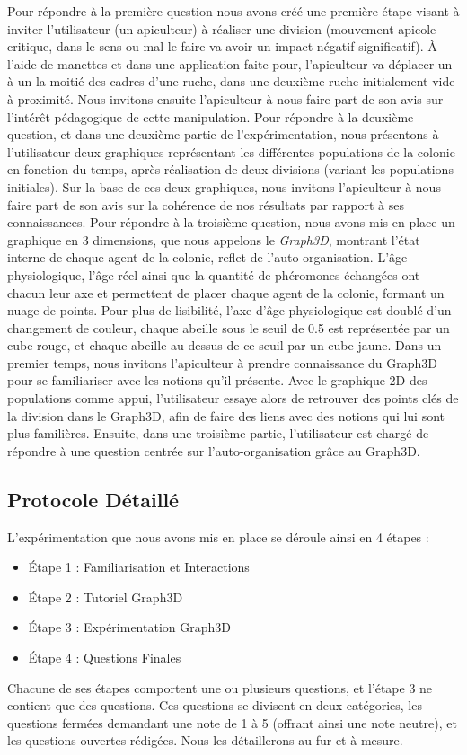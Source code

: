     Pour répondre à la première question nous avons créé une première étape visant à inviter l'utilisateur (un apiculteur) à réaliser une division (mouvement apicole critique, dans le sens ou mal le faire va avoir un impact négatif significatif). À l'aide de manettes et dans une application faite pour, l'apiculteur va déplacer un à un la moitié des cadres d'une ruche, dans une deuxième ruche initialement vide à proximité. Nous invitons ensuite l'apiculteur à nous faire part de son avis sur l'intérêt pédagogique de cette manipulation.
    Pour répondre à la deuxième question, et dans une deuxième partie de l'expérimentation, nous présentons à l'utilisateur deux graphiques représentant les différentes populations de la colonie en fonction du temps, après réalisation de deux divisions (variant les populations initiales). Sur la base de ces deux graphiques, nous invitons l'apiculteur à nous faire part de son avis sur la cohérence de nos résultats par rapport à ses connaissances.
    Pour répondre à la troisième question, nous avons mis en place un graphique en 3 dimensions, que nous appelons le \textit{Graph3D}, montrant l'état interne de chaque agent de la colonie, reflet de l'auto-organisation. L'âge physiologique, l'âge réel ainsi que la quantité de phéromones échangées ont chacun leur axe et permettent de placer chaque agent de la colonie, formant un nuage de points. Pour plus de lisibilité, l'axe d'âge physiologique est doublé d'un changement de couleur, chaque abeille sous le seuil de 0.5 est représentée par un cube rouge, et chaque abeille au dessus de ce seuil par un cube jaune. Dans un premier temps, nous invitons l'apiculteur à prendre connaissance du Graph3D pour se familiariser avec les notions qu'il présente. Avec le graphique 2D des populations comme appui, l'utilisateur essaye alors de retrouver des points clés de la division dans le Graph3D, afin de faire des liens avec des notions qui lui sont plus familières. Ensuite, dans une troisième partie, l'utilisateur est chargé de répondre à une question centrée sur l'auto-organisation grâce au Graph3D.

		
		\subsection{Protocole Détaillé}
		
		L'expérimentation que nous avons mis en place se déroule ainsi en 4 étapes :
		\begin{itemize}
			\item Étape 1 : Familiarisation et Interactions
			\item Étape 2 : Tutoriel Graph3D
			\item Étape 3 : Expérimentation Graph3D
			\item Étape 4 : Questions Finales
		\end{itemize}
		Chacune de ses étapes comportent une ou plusieurs questions, et l'étape 3 ne contient que des questions. Ces questions se divisent en deux catégories, les questions fermées demandant une note de 1 à 5 (offrant ainsi une note neutre), et les questions ouvertes rédigées. Nous les détaillerons au fur et à mesure.
		

